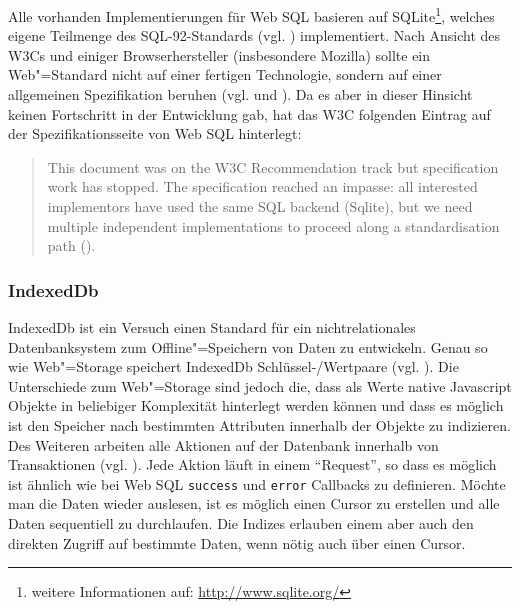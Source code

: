 Alle vorhanden Implementierungen für Web SQL basieren auf SQLite\footnote{weitere Informationen auf: \url{http://www.sqlite.org/}}, welches eigene Teilmenge des SQL-92-Standards (vgl. \cite{SQL92}) implementiert. Nach Ansicht des W3Cs und einiger Browserhersteller (insbesondere Mozilla) sollte ein Web"=Standard nicht auf einer fertigen Technologie, sondern auf einer allgemeinen Spezifikation beruhen (vgl. \cite{W3C2010} und \cite{Ranganathan2010}). Da es aber in dieser Hinsicht keinen Fortschritt in der Entwicklung gab, hat das W3C folgenden Eintrag auf der Spezifikationsseite von Web SQL hinterlegt:
\begin{quotation}
 This document was on the W3C Recommendation track but specification work has stopped. The specification reached an impasse: all interested implementors have used the same SQL backend (Sqlite), but we need multiple independent implementations to proceed along a standardisation path (\cite{W3C2010}).
\end{quotation} 

\subsubsection*{IndexedDb}
IndexedDb ist ein Versuch einen Standard für ein nichtrelationales Datenbanksystem zum Offline"=Speichern von Daten zu entwickeln. Genau so wie Web"=Storage speichert IndexedDb Schlüssel-/Wertpaare (vgl. \cite{Mehta2012}). Die Unterschiede zum Web"=Storage sind jedoch die, dass als Werte native Javascript Objekte in beliebiger Komplexität hinterlegt werden können und dass es möglich ist den Speicher nach bestimmten Attributen innerhalb der Objekte zu indizieren. Des Weiteren arbeiten alle Aktionen auf der Datenbank innerhalb von Transaktionen (vgl. \cite{MDN2011}).  Jede Aktion läuft in einem "`Request"', so dass es möglich ist ähnlich wie bei Web SQL \texttt{success} und \texttt{error} Callbacks zu definieren. Möchte man die Daten wieder auslesen, ist es möglich einen Cursor zu erstellen und alle Daten sequentiell zu durchlaufen. Die Indizes erlauben einem aber auch den direkten Zugriff auf bestimmte Daten, wenn nötig auch über einen Cursor.

